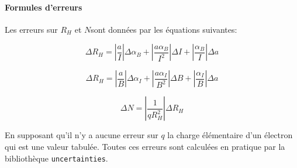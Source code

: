 \paragraph*{Formules d'erreurs}
Les erreurs sur \(R_H\) et \(N\)sont données par les équations suivantes:

\begin{equation}
    \label{eq:erreur:Rh_B}
    \Delta R_H = |\frac{a}{I}|\Delta \alpha_B + |\frac{a \alpha_B}{I^2}|\Delta I + |\frac{\alpha_B}{I}|\Delta a
\end{equation}

\begin{equation}
    \label{eq:erreur:Rh_I}
    \Delta R_H = |\frac{a}{B}|\Delta \alpha_I + |\frac{a \alpha_I}{B^2}|\Delta B + |\frac{\alpha_I}{B}|\Delta a
\end{equation}

\begin{equation}
    \label{eq:erreur:N}
    \Delta N = |\frac{1}{q R_H^2}|\Delta R_H
\end{equation}

En supposant qu'il n'y a aucune erreur sur \(q\) la charge élémentaire d'un électron qui est une valeur tabulée.
Toutes ces erreurs sont calculées en pratique par la bibliothèque \texttt{uncertainties}.
